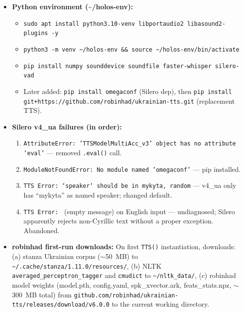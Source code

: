 \documentclass{article}
\theoremstyle{plain}
\theoremstyle{definition}
\theoremstyle{remark}
\begin{document}
\begin{itemize}
\begin{enumerate}
  \item SSH audio blocked: \texttt{pactl} and \texttt{parecord} returned ``Connection refused'' from SSH despite \texttt{pacmd} working. Fixed with \texttt{pacmd load-module module-native-protocol-tcp auth-anonymous=1} + \texttt{export PULSE\_SERVER=tcp:127.0.0.1}.
  \item Verified: \texttt{parecord /tmp/test\_bt.wav \& sleep 3 \&\& kill \$!; paplay /tmp/test\_bt.wav} --- heard own voice through headset.
  \end{enumerate}
\item \textbf{Python environment (\~{}/holos-env):}
  \begin{itemize}
  \item \texttt{sudo apt install python3.10-venv libportaudio2 libasound2-plugins -y}
  \item \texttt{python3 -m venv \~{}/holos-env \&\& source \~{}/holos-env/bin/activate}
  \item \texttt{pip install numpy sounddevice soundfile faster-whisper silero-vad}
  \item Later added: \texttt{pip install omegaconf} (Silero dep), then \texttt{pip install git+https://github.com/robinhad/ukrainian-tts.git} (replacement TTS).
  \end{itemize}
\item \textbf{Silero v4\_ua failures (in order):}
  \begin{enumerate}
  \item \texttt{AttributeError: 'TTSModelMultiAcc\_v3' object has no attribute 'eval'} --- removed \texttt{.eval()} call.
  \item \texttt{ModuleNotFoundError: No module named 'omegaconf'} --- pip installed.
  \item \texttt{TTS Error: `speaker` should be in mykyta, random} --- v4\_ua only has ``mykyta'' as named speaker; changed default.
  \item \texttt{TTS Error: } (empty message) on English input --- undiagnosed; Silero apparently rejects non-Cyrillic text without a proper exception. Abandoned.
  \end{enumerate}
\item \textbf{robinhad first-run downloads:} On first \texttt{TTS()} instantiation, downloads: (a) stanza Ukrainian corpus ($\sim$50~MB) to \texttt{\~{}/.cache/stanza/1.11.0/resources/}, (b) NLTK \texttt{averaged\_perceptron\_tagger} and \texttt{cmudict} to \texttt{\~{}/nltk\_data/}, (c) robinhad model weights (model.pth, config.yaml, spk\_xvector.ark, feats\_stats.npz, $\sim$300~MB total) from \texttt{github.com/robinhad/ukrainian-tts/releases/download/v6.0.0} to the current working directory.

\end{itemize}
\end{document}
